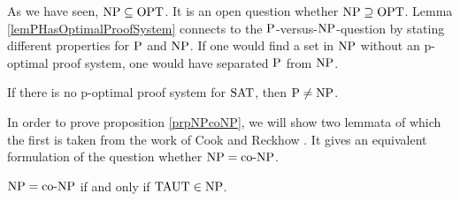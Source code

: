   As we have seen, \(\NP \subseteq \OPT\). It is an open question whether \(\NP \supseteq \OPT\). Lemma \ref{lemPHasOptimalProofSystem} connects to the \(\P\)-versus-\(\NP\)-question by stating different properties for \(\P\) and \(\NP\). If one would find a set in \(\NP\) without an p-optimal proof system, one would have separated \(\P\) from \(\NP\).

  \begin{corollary}
    If there is no p-optimal proof system for \(\SAT\), then \(\P \neq \NP\).
  \end{corollary}  
  
  In order to prove proposition \ref{prpNPcoNP}, we will show two lemmata of which the first is taken from the work of Cook and Reckhow \cite{CR79}. It gives an equivalent formulation of the question whether \(\NP = \coNP\).

  \begin{lemma} \label{lemNPisCoNP}
   \(\NP = \coNP\) if and only if \(\TAUT \in \NP\).
  \end{lemma}


